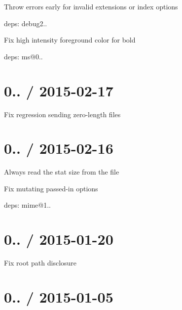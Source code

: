 
\begin{DoxyItemize}
\item Throw errors early for invalid {\ttfamily extensions} or {\ttfamily index} options
\item deps\+: debug2..
\begin{DoxyItemize}
\item Fix high intensity foreground color for bold
\item deps\+: ms@0..
\end{DoxyItemize}
\end{DoxyItemize}

\section*{0.. / 2015-\/02-\/17 }


\begin{DoxyItemize}
\item Fix regression sending zero-\/length files
\end{DoxyItemize}

\section*{0.. / 2015-\/02-\/16 }


\begin{DoxyItemize}
\item Always read the stat size from the file
\item Fix mutating passed-\/in {\ttfamily options}
\item deps\+: mime@1..
\end{DoxyItemize}

\section*{0.. / 2015-\/01-\/20 }


\begin{DoxyItemize}
\item Fix {\ttfamily root} path disclosure
\end{DoxyItemize}

\section*{0.. / 2015-\/01-\/05 }


